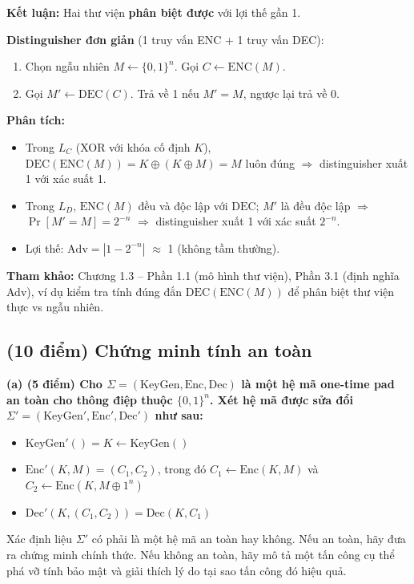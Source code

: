 \textbf{Kết luận:} Hai thư viện \textbf{phân biệt được} với lợi thế gần 1.

\textbf{Distinguisher đơn giản} (1 truy vấn ENC + 1 truy vấn DEC):
\begin{enumerate}
    \item Chọn ngẫu nhiên $M \leftarrow \{0,1\}^n$. Gọi $C \leftarrow \text{ENC}(M)$.
    \item Gọi $M' \leftarrow \text{DEC}(C)$. Trả về 1 nếu $M' = M$, ngược lại trả về 0.
\end{enumerate}

\textbf{Phân tích:}
\begin{itemize}
    \item Trong $L_C$ (XOR với khóa cố định $K$), $\text{DEC}(\text{ENC}(M)) = K \oplus (K \oplus M) = M$ luôn đúng $\Rightarrow$ distinguisher xuất 1 với xác suất 1.
    \item Trong $L_D$, $\text{ENC}(M)$ đều và độc lập với $\text{DEC}$; $M'$ là đều độc lập $\Rightarrow$ $\Pr[M' = M] = 2^{-n}$ $\Rightarrow$ distinguisher xuất 1 với xác suất $2^{-n}$.
    \item Lợi thế: $\text{Adv} = |1 - 2^{-n}|$ $\approx$ 1 (không tầm thường).
\end{itemize}

\textbf{Tham khảo:} Chương 1.3 – Phần 1.1 (mô hình thư viện), Phần 3.1 (định nghĩa Adv), ví dụ kiểm tra tính đúng đắn $\text{DEC}(\text{ENC}(M))$ để phân biệt thư viện thực vs ngẫu nhiên.

\subsection{(10 điểm) Chứng minh tính an toàn}

\textbf{(a) (5 điểm) Cho $\Sigma = (\text{KeyGen}, \text{Enc}, \text{Dec})$ là một hệ mã one-time pad an toàn cho thông điệp thuộc $\{0,1\}^n$. Xét hệ mã được sửa đổi $\Sigma' = (\text{KeyGen}', \text{Enc}', \text{Dec}')$ như sau:}

\begin{itemize}
    \item $\text{KeyGen}'() = K \leftarrow \text{KeyGen}()$
    \item $\text{Enc}'(K, M) = (C_1, C_2)$, trong đó $C_1 \leftarrow \text{Enc}(K, M)$ và $C_2 \leftarrow \text{Enc}(K, M \oplus 1^n)$
    \item $\text{Dec}'(K, (C_1, C_2)) = \text{Dec}(K, C_1)$
\end{itemize}

Xác định liệu $\Sigma'$ có phải là một hệ mã an toàn hay không. Nếu an toàn, hãy đưa ra chứng minh chính thức. Nếu không an toàn, hãy mô tả một tấn công cụ thể phá vỡ tính bảo mật và giải thích lý do tại sao tấn công đó hiệu quả.


